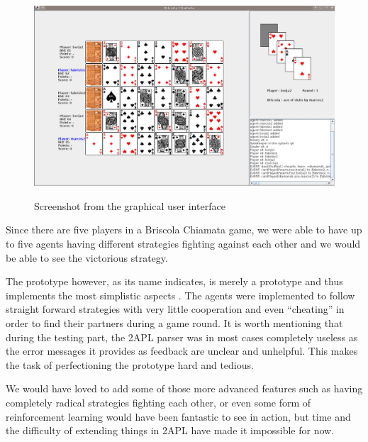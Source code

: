 \documentclass[a4paper]{article}
\begin{document}
\begin{figure}[htp]
  \centering
  \includegraphics[keepaspectratio,scale=0.3]{fig/gui1.png}
  \label{fig:gui1}
  \caption{Screenshot from the graphical user interface}
\end{figure}

Since there are five players in a Briscola Chiamata game, we were able to have up to five agents having different strategies fighting against each other and we would be able to see the victorious strategy. 

The prototype however, as its name indicates, is merely a prototype and thus implements the most simplistic aspects . The agents were implemented to follow straight forward strategies with very little cooperation and even ``cheating'' in order to find their partners during a game round. It is worth mentioning that during the testing part, the 2APL parser was in most cases completely useless as the error messages it provides as feedback are unclear and unhelpful. This makes the task of perfectioning the prototype hard and tedious. %

We would have loved to add some of those more advanced features such as having completely radical strategies fighting each other, or even some form of reinforcement learning would have been fantastic to see in action, but time and the difficulty of extending things in 2APL have made it impossible for now.
\end{document}
